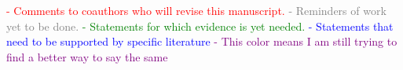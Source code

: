 
\textcolor{red}{- Comments to coauthors who will revise this manuscript.}\newline
\textcolor{gray}{- Reminders of work yet to be done.}\newline
\textcolor{green}{- Statements for which evidence is yet needed.}\newline
\textcolor{blue}{- Statements that need to be supported by specific literature}\newline
\textcolor{purple}{- This color means I am still trying to find a better way to say the same}\newline

\nopagebreak
